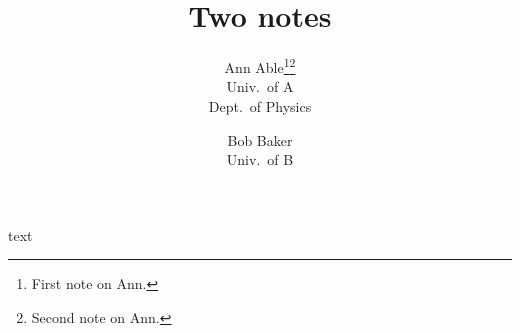 \documentclass{article}
\begin{document}
\title{Two notes}
\author{Ann Able\footnote{First note on Ann.}\footnote{Second note on Ann.} \\ Univ.\ of A \\ Dept.\ of Physics
\and Bob Baker \\ Univ.\ of B}
\date{}
\maketitle
text
\end{document}
